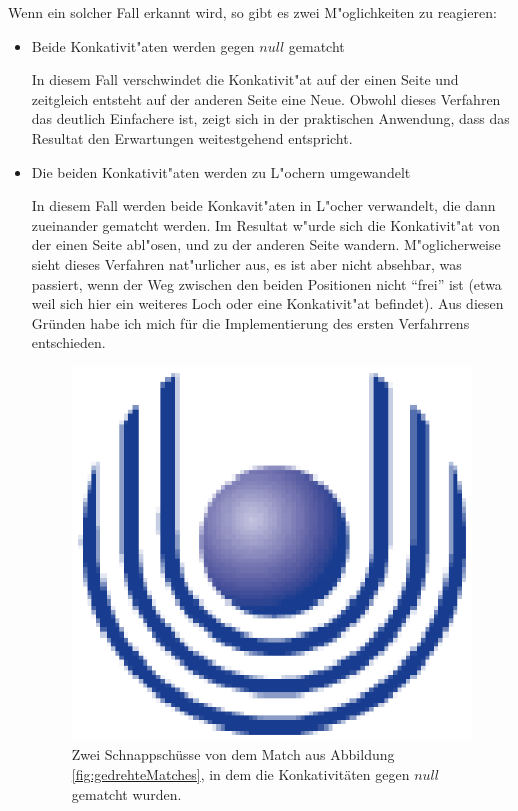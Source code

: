 Wenn ein solcher Fall erkannt wird, so gibt es zwei M"oglichkeiten zu reagieren:
\begin{itemize}
\item Beide Konkativit"aten werden gegen $null$ gematcht

In diesem Fall verschwindet die Konkativit"at auf der einen Seite  und zeitgleich entsteht auf der anderen Seite eine Neue. Obwohl dieses Verfahren das deutlich Einfachere ist, zeigt sich in der praktischen Anwendung, dass das Resultat den Erwartungen weitestgehend entspricht.

\item Die beiden Konkativit"aten werden zu L"ochern umgewandelt

In diesem Fall werden beide Konkavit"aten in L"ocher verwandelt, die dann zueinander gematcht werden. Im Resultat w"urde sich die Konkativit"at von der einen Seite abl"osen, und zu der anderen Seite wandern. M"oglicherweise sieht dieses Verfahren nat"urlicher aus, es ist aber nicht absehbar, was passiert, wenn der Weg zwischen den beiden Positionen nicht "`frei"' ist (etwa weil sich hier ein weiteres Loch oder eine Konkativit"at befindet). Aus diesen Gründen habe ich mich für die Implementierung des ersten Verfahrrens entschieden.
\begin{figure}
	\centering
	\includegraphics{feu_logo2.eps}
	\caption[Schnappschüsse von den gedrehten Polygonen]{Zwei Schnappschüsse von dem Match aus Abbildung  \ref{fig:gedrehteMatches}, in dem die Konkativitäten gegen $null$ gematcht wurden.}
	\label{fig:gedrehteMatches2}
\end{figure}

\end{itemize}


